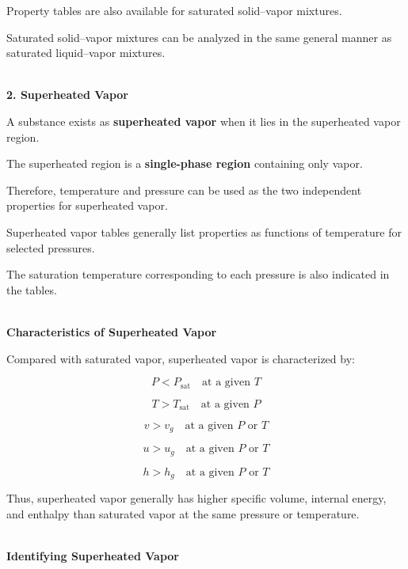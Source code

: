 \documentclass[12pt]{article}
\begin{document}
Property tables are also available for saturated solid--vapor mixtures.

Saturated solid--vapor mixtures can be analyzed in the same general manner as saturated liquid--vapor mixtures.

\textbf{\\ 2. Superheated Vapor}

A substance exists as \textbf{superheated vapor} when it lies in the superheated vapor region.

The superheated region is a \textbf{single-phase region} containing only vapor.

Therefore, temperature and pressure can be used as the two independent properties for superheated vapor.

Superheated vapor tables generally list properties as functions of temperature for selected pressures.

The saturation temperature corresponding to each pressure is also indicated in the tables.

\textbf{\\ Characteristics of Superheated Vapor}

Compared with saturated vapor, superheated vapor is characterized by:

\begin{equation*}
\boxed{P<P_{\mathrm{sat}}\quad\text{at a given }T}
\end{equation*}

\begin{equation*}
\boxed{T>T_{\mathrm{sat}}\quad\text{at a given }P}
\end{equation*}

\begin{equation*}
\boxed{v>v_g\quad\text{at a given }P\text{ or }T}
\end{equation*}

\begin{equation*}
\boxed{u>u_g\quad\text{at a given }P\text{ or }T}
\end{equation*}

\begin{equation*}
\boxed{h>h_g\quad\text{at a given }P\text{ or }T}
\end{equation*}

Thus, superheated vapor generally has higher specific volume, internal energy, and enthalpy than saturated vapor at the same pressure or temperature.

\textbf{\\ Identifying Superheated Vapor}
\end{document}
